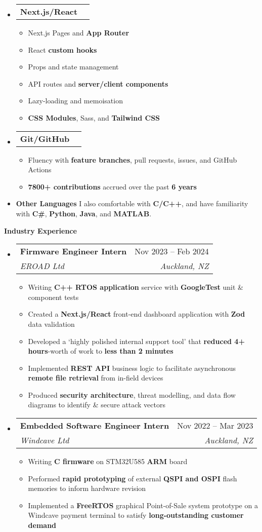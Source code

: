 \documentclass[11pt,a4paper]{article}[leftmargin=*]
\makeatletter
\def \entryspacing {-0pt}
\def \bulletstylei {\faAngleRight\hspace{-4.5pt}}
\renewcommand{\section}[2]{\vspace{5pt}
  \colorbox{secondary}{\color{white}\raggedbottom\normalsize\textbf{{#1}{\hspace{2pt}#2\hspace{4pt}}}}
}
\newcommand{\resumeEntryStart}{\begin{itemize}[leftmargin=2.5mm]}
\newcommand{\resumeEntryEnd}{\end{itemize}\vspace{\entryspacing}}
\newcommand{\resumeItemListStart}{\begin{itemize}[leftmargin=4.5mm]}
\newcommand{\resumeItemListEnd}{\end{itemize}}
\newcommand{\resumeItem}[2][\bulletstylei]{
  \item[\small#1]\small{
    {#2 \vspace{-2pt}}
  }
}
\newcommand{\resumeEntryTSDL}[4]{
  \vspace{-1pt}\item[]
    \begin{tabularx}{0.97\textwidth}{X@{\hspace{60pt}}r}
      \textbf{\color{primary}#1} & {\firabook\color{accent}\small#2} \\
      \textit{\color{accent}\small#3} & \textit{\color{accent}\small#4} \\
    \end{tabularx}\vspace{-6pt}
}
\newcommand{\resumeEntryTD}[2]{
  \vspace{-1pt}\item[]
    \begin{tabularx}{0.97\textwidth}{X@{\hspace{60pt}}r}
      \textbf{\color{primary}#1} & {\firabook\color{accent}\small#2} \\
    \end{tabularx}\vspace{-6pt}
}
\newcommand{\resumeEntryS}[2]{
  \item[]\small{
    \textbf{\color{primary}#1 }{ #2 \vspace{-4pt}}
  }
}
\newcommand{\resumeBf}[1]{\small\textbf{\color{halfbold}#1}}
\makeatother
\begin{document}
\resumeEntryStart
\resumeEntryTD
{Next.js/React}{}
\resumeItemListStart
\resumeItem {Next.js Pages and \resumeBf{App Router}}
\resumeItem {React \resumeBf{custom hooks}}
\resumeItem {Props and state management}
\resumeItem {API routes and \resumeBf{server/client components}}
\resumeItem {Lazy-loading and memoisation}
\resumeItem {\resumeBf{CSS Modules}, Sass, and \resumeBf{Tailwind CSS}}
\resumeItemListEnd
\resumeEntryEnd

\resumeEntryStart
\resumeEntryTD
{Git/GitHub}{}
\resumeItemListStart
\resumeItem {Fluency with \resumeBf{feature branches}, pull requests, issues, and GitHub Actions}
\resumeItem {\resumeBf{7800+ contributions} accrued over the past \resumeBf{6 years}}
\resumeItemListEnd
\resumeEntryEnd

\resumeEntryStart
\resumeEntryS
{Other Languages}{I also comfortable with \resumeBf{C/C++}, and have familiarity with \resumeBf{C\#}, \resumeBf{Python}, \resumeBf{Java}, and \resumeBf{MATLAB}.}
\resumeEntryEnd


\section{\faBriefcase}{Industry Experience}

\resumeEntryStart
\resumeEntryTSDL
{Firmware Engineer Intern}{Nov 2023 -- Feb 2024}
{EROAD Ltd}{Auckland, NZ}

\resumeItemListStart
\resumeItem {Writing \resumeBf{C++ RTOS application} service with \resumeBf{GoogleTest} unit \& component tests}
\resumeItem {Created a \resumeBf{Next.js/React} front-end dashboard application with \resumeBf{Zod} data validation}
\resumeItem {Developed a `highly polished internal support tool' that \resumeBf{reduced 4+ hours}-worth of work to \resumeBf{less than 2 minutes}}
\resumeItem {Implemented \resumeBf{REST API} business logic to facilitate asynchronous \resumeBf{remote file retrieval} from in-field devices}
\resumeItem {Produced \resumeBf{security architecture}, threat modelling, and data flow diagrams to identify \& secure attack vectors}
\resumeItemListEnd
\resumeEntryEnd

\resumeEntryStart
\resumeEntryTSDL
{Embedded Software Engineer Intern}{Nov 2022 -- Mar 2023}
{Windcave Ltd}{Auckland, NZ}

\resumeItemListStart
\resumeItem {Writing \resumeBf{C firmware} on STM32U585 \resumeBf{ARM} board}
\resumeItem {Performed \resumeBf{rapid prototyping} of external \resumeBf{QSPI and OSPI} flash memories to inform hardware revision}
\resumeItem {Implemented a \resumeBf{FreeRTOS} graphical Point-of-Sale system prototype on a Windcave payment terminal to satisfy \resumeBf{long-outstanding customer demand}}
\resumeItemListEnd
\resumeEntryEnd
\end{document}
